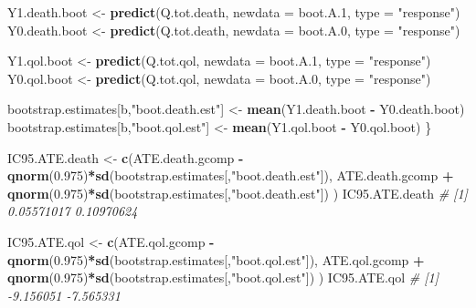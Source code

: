 \documentclass[
]{book}
\newenvironment{Shaded}{\begin{snugshade}}{\end{snugshade}}
\newcommand{\AttributeTok}[1]{\textcolor[rgb]{0.13,0.29,0.53}{#1}}
\newcommand{\CommentTok}[1]{\textcolor[rgb]{0.56,0.35,0.01}{\textit{#1}}}
\newcommand{\FloatTok}[1]{\textcolor[rgb]{0.00,0.00,0.81}{#1}}
\newcommand{\FunctionTok}[1]{\textcolor[rgb]{0.13,0.29,0.53}{\textbf{#1}}}
\newcommand{\NormalTok}[1]{#1}
\newcommand{\OtherTok}[1]{\textcolor[rgb]{0.56,0.35,0.01}{#1}}
\newcommand{\SpecialCharTok}[1]{\textcolor[rgb]{0.81,0.36,0.00}{\textbf{#1}}}
\newcommand{\StringTok}[1]{\textcolor[rgb]{0.31,0.60,0.02}{#1}}
\begin{document}
\begin{Shaded}
\begin{Highlighting}[]
\NormalTok{  Y1.death.boot }\OtherTok{\textless{}{-}} \FunctionTok{predict}\NormalTok{(Q.tot.death, }\AttributeTok{newdata =}\NormalTok{ boot.A}\FloatTok{.1}\NormalTok{, }\AttributeTok{type =} \StringTok{"response"}\NormalTok{)}
\NormalTok{  Y0.death.boot }\OtherTok{\textless{}{-}} \FunctionTok{predict}\NormalTok{(Q.tot.death, }\AttributeTok{newdata =}\NormalTok{ boot.A}\FloatTok{.0}\NormalTok{, }\AttributeTok{type =} \StringTok{"response"}\NormalTok{)}

\NormalTok{  Y1.qol.boot }\OtherTok{\textless{}{-}} \FunctionTok{predict}\NormalTok{(Q.tot.qol, }\AttributeTok{newdata =}\NormalTok{ boot.A}\FloatTok{.1}\NormalTok{, }\AttributeTok{type =} \StringTok{"response"}\NormalTok{)}
\NormalTok{  Y0.qol.boot }\OtherTok{\textless{}{-}} \FunctionTok{predict}\NormalTok{(Q.tot.qol, }\AttributeTok{newdata =}\NormalTok{ boot.A}\FloatTok{.0}\NormalTok{, }\AttributeTok{type =} \StringTok{"response"}\NormalTok{)}

\NormalTok{  bootstrap.estimates[b,}\StringTok{"boot.death.est"}\NormalTok{] }\OtherTok{\textless{}{-}} \FunctionTok{mean}\NormalTok{(Y1.death.boot }\SpecialCharTok{{-}}\NormalTok{ Y0.death.boot)}
\NormalTok{  bootstrap.estimates[b,}\StringTok{"boot.qol.est"}\NormalTok{] }\OtherTok{\textless{}{-}} \FunctionTok{mean}\NormalTok{(Y1.qol.boot }\SpecialCharTok{{-}}\NormalTok{ Y0.qol.boot)}
\NormalTok{\}}

\NormalTok{IC95.ATE.death }\OtherTok{\textless{}{-}} \FunctionTok{c}\NormalTok{(ATE.death.gcomp }\SpecialCharTok{{-}} 
                      \FunctionTok{qnorm}\NormalTok{(}\FloatTok{0.975}\NormalTok{)}\SpecialCharTok{*}\FunctionTok{sd}\NormalTok{(bootstrap.estimates[,}\StringTok{"boot.death.est"}\NormalTok{]),}
\NormalTok{                    ATE.death.gcomp }\SpecialCharTok{+} 
                      \FunctionTok{qnorm}\NormalTok{(}\FloatTok{0.975}\NormalTok{)}\SpecialCharTok{*}\FunctionTok{sd}\NormalTok{(bootstrap.estimates[,}\StringTok{"boot.death.est"}\NormalTok{]) )}
\NormalTok{IC95.ATE.death}
\CommentTok{\# [1] 0.05571017 0.10970624}

\NormalTok{IC95.ATE.qol }\OtherTok{\textless{}{-}} \FunctionTok{c}\NormalTok{(ATE.qol.gcomp }\SpecialCharTok{{-}} 
                    \FunctionTok{qnorm}\NormalTok{(}\FloatTok{0.975}\NormalTok{)}\SpecialCharTok{*}\FunctionTok{sd}\NormalTok{(bootstrap.estimates[,}\StringTok{"boot.qol.est"}\NormalTok{]),}
\NormalTok{                  ATE.qol.gcomp }\SpecialCharTok{+} 
                    \FunctionTok{qnorm}\NormalTok{(}\FloatTok{0.975}\NormalTok{)}\SpecialCharTok{*}\FunctionTok{sd}\NormalTok{(bootstrap.estimates[,}\StringTok{"boot.qol.est"}\NormalTok{]) )}
\NormalTok{IC95.ATE.qol}
\CommentTok{\# [1] {-}9.156051 {-}7.565331}
\end{Highlighting}
\end{Shaded}
\end{document}
